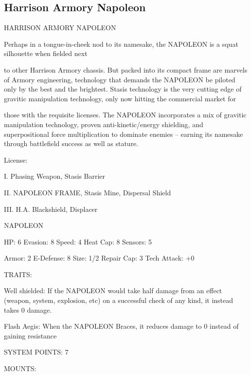 \subsection{Harrison Armory Napoleon}


                             HARRISON ARMORY NAPOLEON  

Perhaps in a tongue-in-cheek nod to its namesake, the NAPOLEON is a squat silhouette when fielded next  

to other Harrison Armory chassis. But packed into its compact frame are marvels of Armory engineering,  
technology that demands the NAPOLEON be piloted only by the best and the brightest. Stasis technology  
is the very cutting edge of gravitic manipulation technology, only now hitting the commercial market for  

those with the requisite licenses. The NAPOLEON incorporates a mix of gravitic manipulation technology,  
proven anti-kinetic/energy shielding, and superpositional force multiplication to dominate enemies --  
earning its namesake through battlefield success as well as stature.    

                                                  License:
 
I. Phasing Weapon, Stasis Barrier
 
II. NAPOLEON FRAME, Stasis Mine, Dispersal Shield
 
III. H.A. Blackshield, Displacer
 

                                               NAPOLEON 

 HP: 6          Evasion: 8                           Speed: 4           Heat Cap: 8       Sensors:  5 

 Armor: 2       E-Defense: 8                         Size: 1/2          Repair Cap: 3     Tech Attack:  
                                                                                          +0 

                                                  TRAITS: 

 Well shielded: If the NAPOLEON would take half damage from an effect (weapon, system, explosion,  
 etc) on a successful check of any kind, it instead takes 0 damage.
 
 Flash Aegis: When the NAPOLEON Braces, it reduces damage to 0 instead of gaining resistance 

                                            SYSTEM POINTS: 7 

                                                 MOUNTS: 

